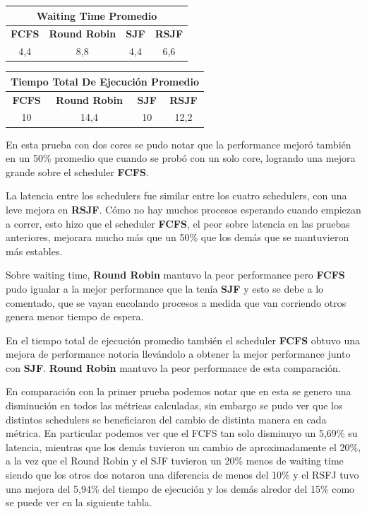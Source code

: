 \begin{center}
	\begin{tabular}{|c|c|c|c|}
		\hline
		\multicolumn{4}{|c|}{\large{\textbf{Waiting Time Promedio}}} \\
		\hline
		\textbf{FCFS} & \textbf{Round Robin} & \textbf{SJF} & \textbf{RSJF} \\
		\hline
		4,4 & 8,8 & 4,4 & 6,6 \\
		\hline
	\end{tabular}
\end{center}

\begin{center}
	\begin{tabular}{|c|c|c|c|}
		\hline
		\multicolumn{4}{|c|}{\large{\textbf{Tiempo Total De Ejecución Promedio}}} \\
		\hline
		\textbf{FCFS} & \textbf{Round Robin} & \textbf{SJF} & \textbf{RSJF} \\
		\hline
		10 & 14,4 & 10 & 12,2 \\
		\hline
	\end{tabular}
\end{center}

En esta prueba con dos cores se pudo notar que la performance mejoró también en un 50\% promedio que cuando se probó con un solo core, logrando una mejora grande sobre el scheduler \textbf{FCFS}.

La latencia entre los schedulers fue similar entre los cuatro schedulers, con una leve mejora en \textbf{RSJF}. Cómo no hay muchos procesos esperando cuando empiezan a correr, esto hizo que el scheduler \textbf{FCFS}, el peor sobre latencia en las pruebas anteriores, mejorara mucho más que un 50\% que los demás que se mantuvieron más estables.

Sobre waiting time, \textbf{Round Robin} mantuvo la peor performance pero \textbf{FCFS} pudo igualar a la mejor performance que la tenía \textbf{SJF} y esto se debe a lo comentado, que se vayan encolando procesos a medida que van corriendo otros genera menor tiempo de espera.

En el tiempo total de ejecución promedio también el scheduler \textbf{FCFS} obtuvo una mejora de performance notoria llevándolo a obtener la mejor performance junto con \textbf{SJF}. \textbf{Round Robin} mantuvo la peor performance de esta comparación.

En comparación con la primer prueba podemos notar que en esta se genero una disminución en todos las métricas calculadas, sin embargo se pudo ver que los distintos schedulers se beneficiaron del cambio de distinta manera en cada métrica. En particular podemos ver que el FCFS tan solo disminuyo un 5,69\% su latencia, mientras que los demás tuvieron un cambio de aproximadamente el 20\%, a la vez que el Round Robin y el SJF tuvieron un 20\% menos de waiting time siendo que los otros dos notaron una diferencia de menos del 10\% y el RSFJ tuvo una mejora del 5,94\% del tiempo de ejecución y los demás alredor del 15\% como se puede ver en la siguiente tabla.

